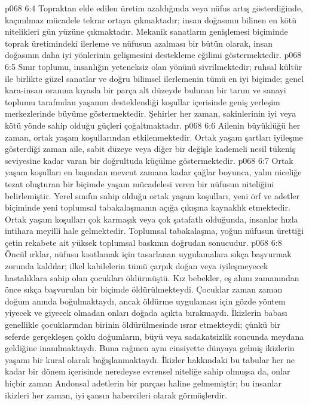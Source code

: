 \vs p068 6:4 Topraktan elde edilen üretim azaldığında veya nüfus artış gösterdiğinde, kaçınılmaz mücadele tekrar ortaya çıkmaktadır; insan doğasının bilinen en kötü nitelikleri gün yüzüne çıkmaktadır. Mekanik sanatların genişlemesi biçiminde toprak üretimindeki ilerleme ve nüfusun azalması bir bütün olarak, insan doğasının daha iyi yönlerinin gelişmesini destekleme eğilimi göstermektedir.
\vs p068 6:5 Sınır toplumu, insanlığın yeteneksiz olan yönünü sivrilmektedir; ruhsal kültür ile birlikte güzel sanatlar ve doğru bilimsel ilerlemenin tümü en iyi biçimde; genel kara\hyp{}insan oranına kıyasla bir parça alt düzeyde bulunan bir tarım ve sanayi toplumu tarafından yaşamın desteklendiği koşullar içerisinde geniş yerleşim merkezlerinde büyüme göstermektedir. Şehirler her zaman, sakinlerinin iyi veya kötü yönde sahip olduğu güçleri çoğaltmaktadır.
\vs p068 6:6 Ailenin büyüklüğü her zaman, ortak yaşam koşullarından etkilenmektedir. Ortak yaşam şartları iyileşme gösterdiği zaman aile, sabit düzeye veya diğer bir değişle kademeli nesil tükeniş seviyesine kadar varan bir doğrultuda küçülme göstermektedir.
\vs p068 6:7 Ortak yaşam koşulları en başından mevcut zamana kadar çağlar boyunca, yalın niceliğe tezat oluşturan bir biçimde yaşam mücadelesi veren bir nüfusun niteliğini belirlemiştir. Yerel sınıfın sahip olduğu ortak yaşam koşulları, yeni örf ve adetler biçiminde yeni toplumsal tabakalaşmanın açığa çıkışına kaynaklık etmektedir. Ortak yaşam koşulları çok karmaşık veya çok şatafatlı olduğunda, insanlar hızla intihara meyilli hale gelmektedir. Toplumsal tabakalaşma, yoğun nüfusun ürettiği çetin rekabete ait yüksek toplumsal baskının doğrudan sonucudur.
\vs p068 6:8 Öncül ırklar, nüfusu kısıtlamak için tasarlanan uygulamalara sıkça başvurmak zorunda kaldılar; ilkel kabilelerin tümü çarpık doğan veya iyileşmeyecek hastalıklara sahip olan çocukları öldürmüştü. Kız bebekler, eş alımı zamanından önce sıkça başvurulan bir biçimde öldürülmekteydi. Çocuklar zaman zaman doğum anında boğulmaktaydı, ancak öldürme uygulaması için gözde yöntem yiyecek ve giyecek olmadan onları doğada açıkta bırakmaydı. İkizlerin babası genellikle çocuklarından birinin öldürülmesinde ısrar etmekteydi; çünkü bir seferde gerçekleşen çoklu doğumların, büyü veya sadakatsizlik soncunda meydana geldiğine inanılmaktaydı. Buna rağmen aynı cinsiyette dünyaya gelmiş ikizlerin yaşamı bir kural olarak bağışlanmaktaydı. İkizler hakkındaki bu tabular her ne kadar bir dönem içerisinde neredeyse evrensel niteliğe sahip olmuşsa da, onlar hiçbir zaman Andonsal adetlerin bir parçası haline gelmemiştir; bu insanlar ikizleri her zaman, iyi şansın habercileri olarak görmüşlerdir.
